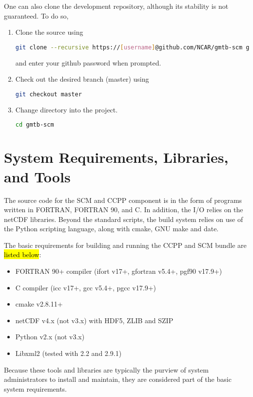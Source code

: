 One can also clone the development repository, although its stability is not guaranteed. To do so,
\begin{enumerate}
    \item Clone the source using
\begin{lstlisting}[language=bash]
git clone --recursive https://[username]@github.com/NCAR/gmtb-scm gmtb-scm
\end{lstlisting}
    and enter your github password when prompted.
    \item Check out the desired branch (master) using
\begin{lstlisting}[language=bash]
git checkout master
\end{lstlisting}
    \item Change directory into the project.
\begin{lstlisting}[language=bash]
cd gmtb-scm
\end{lstlisting}
\end{enumerate}


\section{System Requirements, Libraries, and Tools}
\label{section: systemrequirements}

The source code for the SCM and CCPP component is in the form of programs written in FORTRAN, FORTRAN 90, and C. In addition, the I/O relies on the netCDF libraries. Beyond the standard scripts, the build system relies on use of the Python scripting language, along with cmake, GNU make and date.

The basic requirements for building and running the CCPP and SCM bundle are \hl{listed below}:
\begin{itemize}
    \item FORTRAN 90+ compiler (ifort v17+, gfortran v5.4+, pgf90 v17.9+)
    \item C compiler (icc v17+, gcc v5.4+, pgcc v17.9+)
    \item cmake v2.8.11+
    \item netCDF v4.x (not v3.x) with HDF5, ZLIB and SZIP
    \item Python v2.x (not v3.x)
    \item Libxml2 (tested with 2.2 and 2.9.1)
\end{itemize}

Because these tools and libraries are typically the purview of system administrators to install and maintain, they are considered  part of the basic system requirements.

